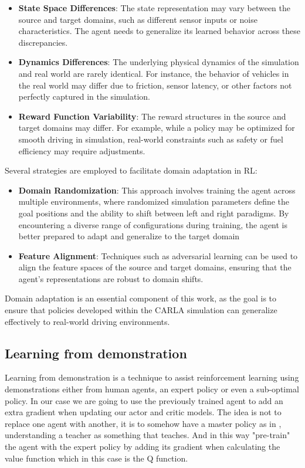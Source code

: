 \begin{itemize}
    \item \textbf{State Space Differences}: The state representation may vary between the source and target domains, such as different sensor inputs or noise characteristics. The agent needs to generalize its learned behavior across these discrepancies.

    \item \textbf{Dynamics Differences}: The underlying physical dynamics of the simulation and real world are rarely identical. For instance, the behavior of vehicles in the real world may differ due to friction, sensor latency, or other factors not perfectly captured in the simulation.

    \item \textbf{Reward Function Variability}: The reward structures in the source and target domains may differ. For example, while a policy may be optimized for smooth driving in simulation, real-world constraints such as safety or fuel efficiency may require adjustments.
\end{itemize}

Several strategies are employed to facilitate domain adaptation in RL:

\begin{itemize}
    \item \textbf{Domain Randomization}: This approach involves training the agent across multiple environments, where randomized simulation parameters define the goal positions and the ability to shift between left and right paradigms. By encountering a diverse range of configurations during training, the agent is better prepared to adapt and generalize to the target domain

    \item \textbf{Feature Alignment}: Techniques such as adversarial learning can be used to align the feature spaces of the source and target domains, ensuring that the agent's representations are robust to domain shifts.

\end{itemize}

Domain adaptation is an essential component of this work, as the goal is to ensure that policies developed within the CARLA simulation can generalize effectively to real-world driving environments.

\subsection*{Learning from demonstration}
Learning from demonstration is a technique to assist reinforcement learning using demonstrations either from human agents, an expert policy or even a sub-optimal policy. In our case we are going to use the previously trained agent to add an extra gradient when updating our actor and critic models. The idea is not to replace one agent with another, it is to somehow have a master policy as in \cite{pretraining_tl}, understanding a teacher as something that teaches. And in this way "pre-train" the agent with the expert policy by adding its gradient when calculating the value function which in this case is the Q function.

